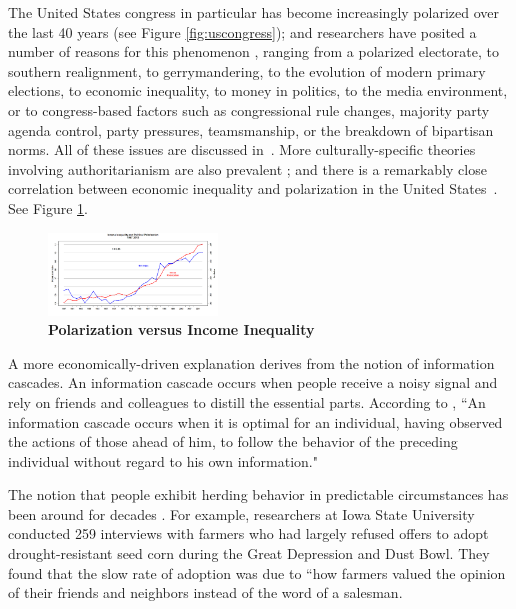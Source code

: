 The United States congress in particular has become increasingly polarized over the last 40 years (see Figure \ref{fig:uscongress}); and
researchers have posited a number of reasons for this phenomenon \cite{barber2015causes}\cite{poole1984polarization}, ranging from a polarized electorate, to southern realignment, to gerrymandering, to the evolution of modern primary elections, to economic inequality, to money in politics, to the media environment, or to congress-based factors such as congressional rule changes, majority party agenda control, party pressures, teamsmanship, or the breakdown of bipartisan norms.  All of these issues are discussed in~\cite{poole1984polarization}.
More culturally-specific theories involving authoritarianism are also prevalent \cite{hetherington2009authoritarianism}; and there is a remarkably close correlation between economic
inequality and polarization in the United States~\cite{mccarty2006polarized}.  See Figure \ref{fig:inequality}.

\begin{figure}[htbp]
\begin{center}
\includegraphics[width=0.4\textwidth]{figs/8141eb7a0}
\caption{{\bf Polarization versus Income Inequality}}
\label{fig:inequality}
\end{center}
\end{figure}


A more economically-driven explanation derives from the notion of information cascades. An information cascade occurs when people receive a noisy signal and rely on friends and colleagues to distill the essential parts.  According to \cite{bikhchandani1992theory},
``An information cascade occurs when it is optimal for an individual, having observed the actions of those ahead of him, to follow the behavior of the preceding individual without regard to his own information." 

The notion that people exhibit herding behavior in predictable circumstances has been around for decades \cite{shiller1995conversation}.  For example, researchers at Iowa State University conducted 259 interviews with farmers who had largely refused offers to adopt drought-resistant seed corn during the Great Depression and Dust Bowl.  They found that the slow rate of adoption was due to ``how farmers valued the opinion of their friends and neighbors instead of the word of a salesman\cite{beal1957diffusion}.



